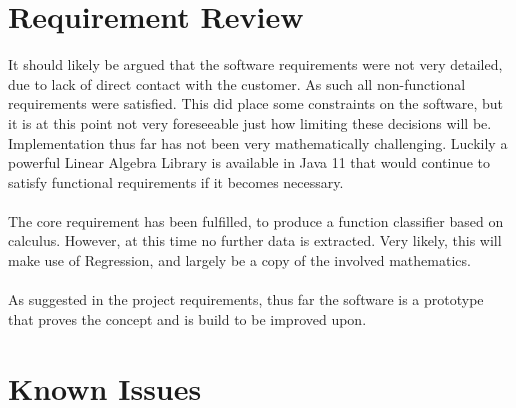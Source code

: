 \documentclass[main.tex]{subfiles}
\begin{document}
    
  \section{Requirement Review}
    
    It should likely be argued that the software requirements were not very detailed, due to lack of direct contact with the customer. As such all non-functional requirements were satisfied. This did place some constraints on the software, but it is at this point not very foreseeable just how limiting these decisions will be. Implementation thus far has not been very mathematically challenging. Luckily a powerful Linear Algebra Library is available in Java 11 \cite{} that would continue to satisfy functional requirements if it becomes necessary.
    \\\\
    The core requirement has been fulfilled, to produce a function classifier based on calculus. However, at this time no further data is extracted. Very likely, this will make use of Regression, and largely be a copy of the involved mathematics.
    \\\\
    As suggested in the project requirements, thus far the software is a prototype that proves the concept and is build to be improved upon.
    
  \section{Known Issues}
    
\end{document}
